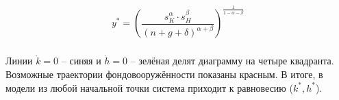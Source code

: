 \documentclass[14pt,fleqn]{extarticle}
\begin{document}
	\begin{ceqn}
		\begin{align*}
			y^* = \left(\dfrac{s_K^{\alpha} \cdot s_H^\beta}{(n + g + \delta)^{\alpha+\beta}}\right)^{\frac{1}{1-\alpha-\beta}}\\
		\end{align*}
	\end{ceqn}
	
	Линии $\dot{k} = 0$ -- синяя и $\dot{h} = 0$ -- зелёная делят диаграмму на четыре квадранта. Возможные траектории фондовооружённости показаны красным. В итоге, в модели из любой начальной точки система приходит к равновесию ($k^*, h^*$).
\end{document}
